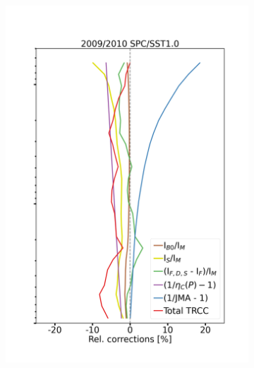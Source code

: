 \documentclass{article}
\begin{document}
\begin{figure}
\begin{subfigure}[t]{0.27\textwidth}
            \includegraphics[width=\linewidth]{png/v7_relative_corrections_unc__sm_hv_0910_TRRM_SPC1010}
        \end{subfigure}%
    \hspace{-0.54cm}
        \begin{subfigure}[t]{0.27\textwidth}

\end{subfigure}
\end{figure}
\end{document}
